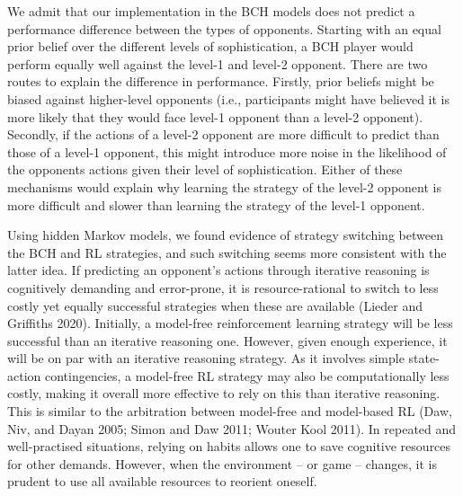 \documentclass[smallextended]{svjour3}       %
\begin{document}
We admit that our implementation in the BCH models does not predict a
performance difference between the types of opponents. Starting with an
equal prior belief over the different levels of sophistication, a BCH
player would perform equally well against the level-1 and level-2
opponent. There are two routes to explain the difference in performance.
Firstly, prior beliefs might be biased against higher-level opponents
(i.e., participants might have believed it is more likely that they
would face level-1 opponent than a level-2 opponent). Secondly, if the
actions of a level-2 opponent are more difficult to predict than those
of a level-1 opponent, this might introduce more noise in the likelihood
of the opponents actions given their level of sophistication. Either of
these mechanisms would explain why learning the strategy of the level-2
opponent is more difficult and slower than learning the strategy of the
level-1 opponent.

Using hidden Markov models, we found evidence of strategy switching
between the BCH and RL strategies, and such switching seems more
consistent with the latter idea. If predicting an opponent's actions
through iterative reasoning is cognitively demanding and error-prone, it
is resource-rational to switch to less costly yet equally successful
strategies when these are available (Lieder and Griffiths 2020).
Initially, a model-free reinforcement learning strategy will be less
successful than an iterative reasoning one. However, given enough
experience, it will be on par with an iterative reasoning strategy. As
it involves simple state-action contingencies, a model-free RL strategy
may also be computationally less costly, making it overall more
effective to rely on this than iterative reasoning. This is similar to
the arbitration between model-free and model-based RL (Daw, Niv, and
Dayan 2005; Simon and Daw 2011; Wouter Kool 2011). In repeated and
well-practised situations, relying on habits allows one to save
cognitive resources for other demands. However, when the environment --
or game -- changes, it is prudent to use all available resources to
reorient oneself.
\end{document}
